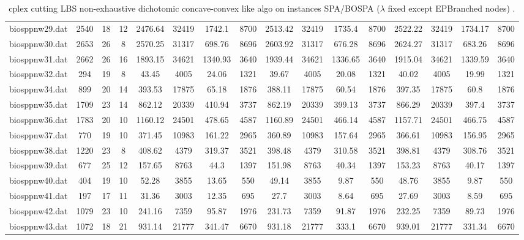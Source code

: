 \begin{sidewaystable}[!ht]
{\begin{tabular}{lccccccccccccccc}
biosppnw29.dat & 2540 & 18 & 12 & 2476.64 & 32419 & 1742.1 & 8700 & 2513.42 & 32419 & 1735.4 & 8700 & 2522.22 & 32419 & 1734.17 & 8700 \\
biosppnw30.dat & 2653 & 26 & 8 & 2570.25 & 31317 & 698.76 & 8696 & 2603.92 & 31317 &  \textcolor{blue2}{676.28} & 8696 & 2624.27 & 31317 & 683.26 & 8696 \\
biosppnw31.dat & 2662 & 26 & 16 & 1893.15 & 34621 & 1340.93 & 3640 & 1939.44 & 34621 &  \textcolor{blue2}{1336.65} & 3640 & 1915.04 & 34621 & 1339.59 & 3640 \\
biosppnw32.dat & 294 & 19 & 8 & 43.45 & 4005 & 24.06 & 1321 & 39.67 & 4005 & 20.08 & 1321 & 40.02 & 4005 & 19.99 & 1321 \\
biosppnw34.dat & 899 & 20 & 14 & 393.53 & 17875 & 65.18 & 1876 & 388.11 & 17875 & 60.54 & 1876 & 397.35 & 17875 & 60.8 & 1876 \\
biosppnw35.dat & 1709 & 23 & 14 & 862.12 & 20339 & 410.94 & 3737 & 862.19 & 20339 & 399.13 & 3737 & 866.29 & 20339 &  \textcolor{blue2}{397.4} & 3737 \\
biosppnw36.dat & 1783 & 20 & 10 & 1160.12 & 24501 & 478.65 & 4587 & 1160.89 & 24501 &  \textcolor{blue2}{466.14} & 4587 & 1157.71 & 24501 & 466.75 & 4587 \\
biosppnw37.dat & 770 & 19 & 10 & 371.45 & 10983 & 161.22 & 2965 & 360.89 & 10983 & 157.64 & 2965 & 366.61 & 10983 & 156.95 & 2965 \\
biosppnw38.dat & 1220 & 23 & 8 & 408.62 & 4379 & 319.37 & 3521 & 398.48 & 4379 & 310.58 & 3521 & 398.81 & 4379 &  \textcolor{blue2}{308.76} & 3521 \\
biosppnw39.dat & 677 & 25 & 12 & 157.65 & 8763 & 44.3 & 1397 & 151.98 & 8763 & 40.34 & 1397 & 153.23 & 8763 & 40.17 & 1397 \\
biosppnw40.dat & 404 & 19 & 10 & 52.28 & 3855 & 13.65 & 550 & 49.14 & 3855 & 9.87 & 550 & 48.76 & 3855 & 9.87 & 550 \\
biosppnw41.dat & 197 & 17 & 11 & 31.36 & 3003 & 12.35 & 695 & 27.7 & 3003 & 8.64 & 695 & 27.69 & 3003 & 8.59 & 695 \\
biosppnw42.dat & 1079 & 23 & 10 & 241.16 & 7359 & 95.87 & 1976 & 231.73 & 7359 & 91.87 & 1976 & 232.25 & 7359 & 89.73 & 1976 \\
biosppnw43.dat & 1072 & 18 & 21 & 931.14 & 21777 & 341.47 & 6670 & 931.18 & 21777 & 333.1 & 6670 & 939.01 & 21777 & 331.34 & 6670 \\
\bottomrule
\end{tabular}
}%
\caption{cplex cutting LBS non-exhaustive dichotomic concave-convex like algo on instances SPA/BOSPA ($\lambda$ fixed except EPBranched nodes) .}
\end{sidewaystable}
